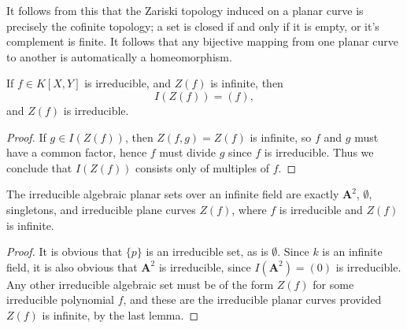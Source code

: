 \begin{remark}
        It follows from this that the Zariski topology induced on a planar curve is precisely the cofinite topology; a set is closed if and only if it is empty, or it's complement is finite. It follows that any bijective mapping from one planar curve to another is automatically a homeomorphism.
\end{remark}


\begin{corollary}
    If $f \in K[X,Y]$ is irreducible, and $Z(f)$ is infinite, then
    \[ I(Z(f)) = (f), \]
    and $Z(f)$ is irreducible.
\end{corollary}
\begin{proof}
    If $g \in I(Z(f))$, then $Z(f,g) = Z(f)$ is infinite, so $f$ and $g$ must have a common factor, hence $f$ must divide $g$ since $f$ is irreducible. Thus we conclude that $I(Z(f))$ consists only of multiples of $f$.
\end{proof}

\begin{corollary}
    The irreducible algebraic planar sets over an infinite field are exactly $\mathbf{A}^2$, $\emptyset$, singletons, and irreducible plane curves $Z(f)$, where $f$ is irreducible and $Z(f)$ is infinite.
\end{corollary}
\begin{proof}
    It is obvious that $\{ p \}$ is an irreducible set, as is $\emptyset$. Since $k$ is an infinite field, it is also obvious that $\mathbf{A}^2$ is irreducible, since $I(\mathbf{A}^2) = (0)$ is irreducible. Any other irreducible algebraic set must be of the form $Z(f)$ for some irreducible polynomial $f$, and these are the irreducible planar curves provided $Z(f)$ is infinite, by the last lemma.
\end{proof}

